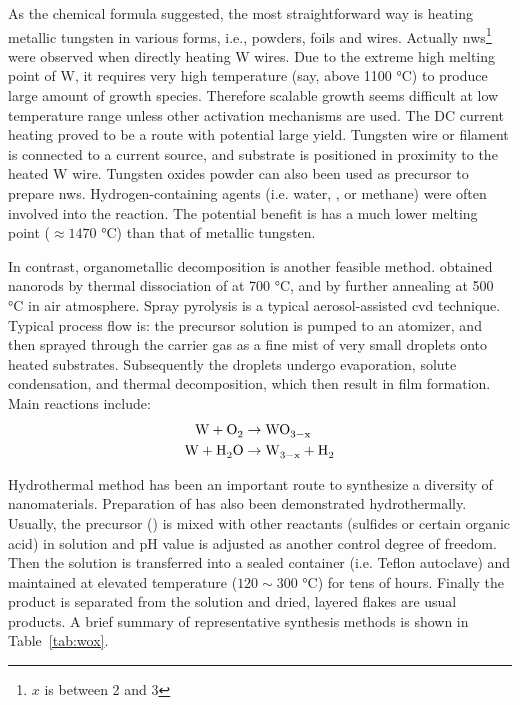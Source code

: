 As the chemical formula  suggested, the most straightforward way is heating metallic tungsten in various forms,\cite{Zhou2005a,Cao2009,Hsieh2010} i.e., powders, foils and wires. Actually  \glspl{nw}\footnote{$x$ is between 2 and 3} were observed when directly heating W wires.\cite{Gu2002a} Due to the extreme high melting point of W, it requires very high temperature (say, above 1100 \si{\degreeCelsius}) to produce large amount of growth species. Therefore scalable growth seems difficult at low temperature range unless other activation mechanisms are used. The DC current heating proved to be a route with potential large yield. Tungsten wire or filament is connected to a current source, and substrate is positioned in proximity to the heated W wire.\cite{Lingfei2006,Thangala2007,Chang2007} Tungsten oxides powder can also been used as precursor to prepare  \glspl{nw}.\cite{Huang2008a,Wang2009} Hydrogen-containing agents (i.e. water, , or methane\cite{Klinke2005}) were often involved into the reaction.\cite{Baek2007,Karuppanan2007} The potential benefit is  has a much lower melting point ($\approx 1470$ \si{\degreeCelsius}) than that of metallic tungsten.

In contrast, organometallic decomposition is another feasible method. \citeauthor{Pol2005} obtained  nanorods by thermal dissociation of  at 700 \si{\degreeCelsius}, and  by further annealing at 500 \si{\degreeCelsius} in air atmosphere.\cite{Pol2005} Spray pyrolysis is a typical aerosol-assisted \gls{cvd} technique. Typical process flow is: the precursor solution is pumped to an atomizer, and then sprayed through the carrier gas as a fine mist of very small droplets onto heated substrates. Subsequently the droplets undergo evaporation, solute condensation, and thermal decomposition, which then result in film formation.\cite{Zheng2011} Main reactions include:
\begin{align}
\cee{W + O2 &\rightarrow WO_{3-x}\\
W + H2O &\rightarrow  W_{3-x} + H2}
\end{align}

Hydrothermal method has been an important route to synthesize a diversity of nanomaterials. Preparation of  has also been demonstrated hydrothermally.\cite{Lee2003,Gu2007} Usually, the precursor () is mixed with other reactants (sulfides or certain organic acid) in solution and pH value is adjusted as another control degree of freedom. Then the solution is transferred into a sealed container (i.e. Teflon autoclave) and maintained at elevated temperature ($120 \sim 300$ \si{\degreeCelsius}) for tens of hours. Finally the product is separated from the solution and dried, layered  flakes are usual products. A brief summary of representative synthesis methods is shown in Table~\ref{tab:wox}.

